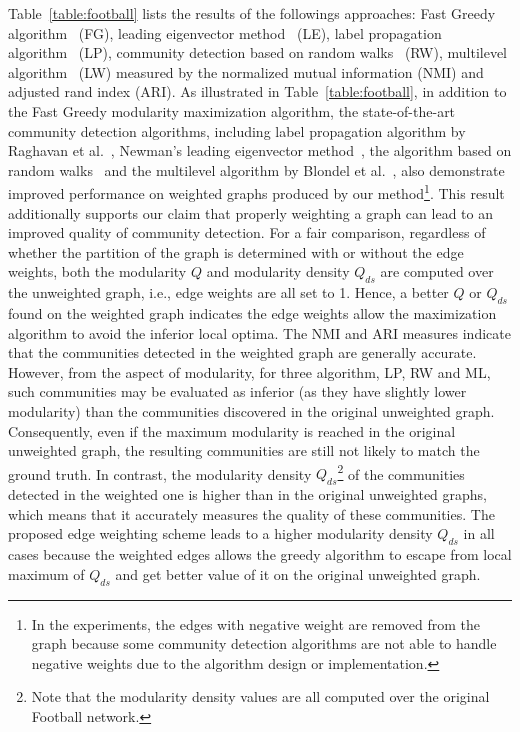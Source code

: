Table~\ref{table:football} lists the results of the followings approaches: Fast Greedy algorithm~\cite{clauset2004finding} (FG), leading eigenvector method~\cite{newman2006finding} (LE), label propagation algorithm~\cite{raghavan2007near} (LP), community detection based on random walks~\cite{pons2005computing} (RW), multilevel algorithm~\cite{blondel2008fast} (LW) measured by the normalized mutual information (NMI) and adjusted rand index (ARI). As illustrated in Table~\ref{table:football}, in addition to the Fast Greedy modularity maximization algorithm, the state-of-the-art community detection algorithms, including label propagation algorithm by Raghavan et al.~\cite{raghavan2007near}, Newman's leading eigenvector method~\cite{newman2006finding}, the algorithm based on random walks~\cite{pons2005computing} and the multilevel algorithm by Blondel et al.~\cite{blondel2008fast}, also demonstrate improved performance on weighted graphs produced by our method\footnote{In the experiments, the edges with negative weight are removed from the graph because some community detection algorithms are not able to handle negative weights due to the algorithm design or implementation.}. This result additionally supports our claim that properly weighting a graph can lead to an improved quality of community detection.
For a fair comparison, regardless of whether the partition of the graph is determined with or without the edge weights, both the modularity $Q$ and modularity density $Q_{ds}$ are computed over the unweighted graph, i.e., edge weights are all set to 1. Hence, a better $Q$ or $Q_{ds}$ found on the weighted graph indicates the edge weights allow the maximization algorithm to avoid the inferior local optima. The NMI and ARI measures indicate that the communities detected in the weighted graph are generally accurate. However, from the aspect of modularity, for three algorithm, LP, RW and ML, such communities may be evaluated as inferior (as they have slightly lower modularity) than the communities discovered in the original unweighted graph. Consequently, even if the maximum modularity is reached in the original unweighted graph, the resulting communities are still not likely to match the ground truth. In contrast, the modularity density $Q_{ds}$\footnote{Note that the modularity density values are all computed over the original Football network.} of the communities detected in the weighted one is higher than in the original unweighted graphs, which means that it accurately measures the quality of these communities. The proposed edge weighting scheme leads to a higher modularity density $Q_{ds}$ in all cases because the weighted edges allows the greedy algorithm to escape from local maximum of $Q_{ds}$ and get better value of it on the original unweighted graph. 
